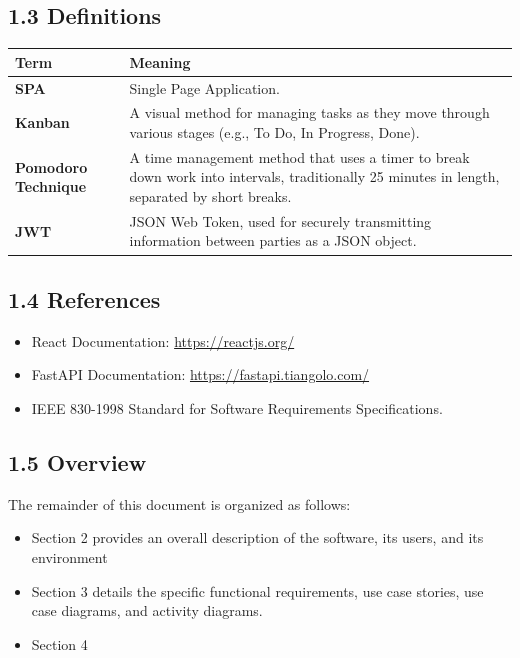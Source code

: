 \documentclass[12pt]{article}
\begin{document}
\subsection*{1.3 Definitions}

\begin{table}[htbp]
    \centering
    \label{tab:terms}
    \begin{tabular}{>{\bfseries}l p{10cm}}
        \toprule
        Term & Meaning \\
        \midrule
        SPA & Single Page Application. \\
        \addlinespace
        Kanban & A visual method for managing tasks as they move through various stages (e.g., To Do, In Progress, Done). \\
        \addlinespace
        Pomodoro Technique & A time management method that uses a timer to break down work into intervals, traditionally 25 minutes in length, separated by short breaks. \\
        \addlinespace
        JWT & JSON Web Token, used for securely transmitting information between parties as a JSON object. \\
        \bottomrule
    \end{tabular}
    
\end{table}

\subsection*{1.4 References}
\begin{itemize}
    \item React Documentation: \url{https://reactjs.org/}
    \item FastAPI Documentation: \url{https://fastapi.tiangolo.com/}
    \item IEEE 830-1998 Standard for Software Requirements Specifications.
\end{itemize}

\subsection*{1.5 Overview}
The remainder of this document is organized as follows:
\begin{itemize}
   \item Section 2 provides an overall description of the software, its users, and its environment
   \item Section 3 details the specific functional requirements, use case stories, use case diagrams, and activity diagrams.
   \item Section 4
 \end{itemize}
 
\end{document}

